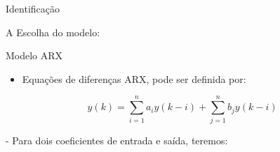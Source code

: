 \documentclass[aspectratio=169]{beamer}
\begin{document}
\begin{frame}[fragile]{Identificação}

A Escolha do modelo:

  
    \begin{block}{Modelo ARX}
        \begin{itemize}
            \item Equações de diferenças ARX, pode ser definida por:
        \end{itemize}
        
        \begin{equation*}
            y(k) = \sum_{i=1}^{n} a_i y(k - i) + \sum_{j=1}^{n} b_j y(k - i)
        \end{equation*}
    \end{block}
- Para dois coeficientes de entrada e saída, teremos:

\end{frame}
\end{document}
